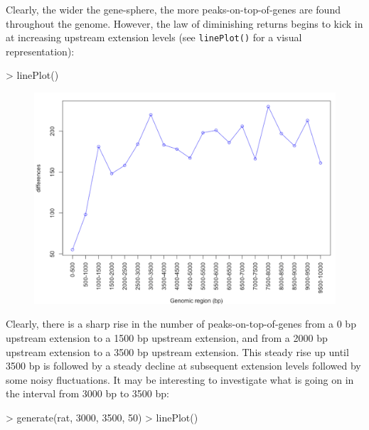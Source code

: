 \documentclass[12pt]{article}
\begin{document}
Clearly, the wider the gene-sphere, the more peaks-on-top-of-genes are found throughout the genome.  However, the law of diminishing returns begins to kick in at increasing upstream extension levels (see \texttt{linePlot()} for a visual representation):

\begin{Schunk}
\begin{Sinput}
> linePlot()
\end{Sinput}
\end{Schunk}

\begin{figure}[H]
\centering
\includegraphics{figures/fig2.png}
\end{figure}

Clearly, there is a sharp rise in the number of peaks-on-top-of-genes from a 0 bp upstream extension to a 1500 bp upstream extension, and from a 2000 bp upstream extension to a 3500 bp upstream extension.  This steady rise up until 3500 bp is followed by a steady decline at subsequent extension levels followed by some noisy fluctuations.  It may be interesting to investigate what is going on in the interval from 3000 bp to 3500 bp: 

\begin{Schunk}
\begin{Sinput}
> generate(rat, 3000, 3500, 50)
> linePlot()
\end{Sinput}
\end{Schunk}
\end{document}
